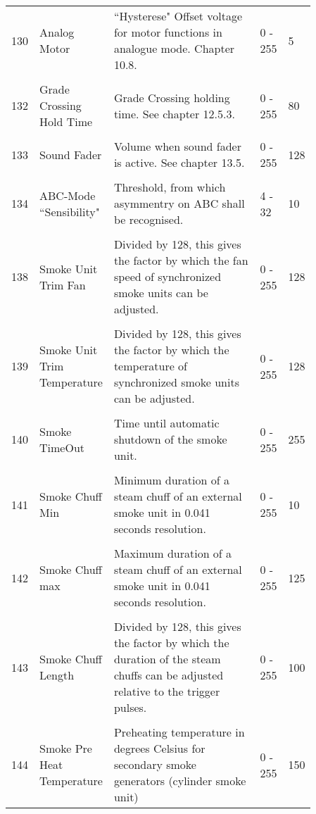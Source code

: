 \begin{tabular}{p{0.075\linewidth} p{0.15\linewidth} p{0.525\linewidth} p{0.06\linewidth} p{0.05\linewidth}}
\\
130 & Analog Motor & ``Hysterese" Offset voltage for motor functions in analogue mode. Chapter 10.8. & 0 - 255 & 5\\
\\
132 & Grade Crossing Hold Time & Grade Crossing holding time. See chapter 12.5.3. & 0 - 255 & 80\\
\\
133 & Sound Fader & Volume when sound fader is active. See chapter 13.5. & 0 - 255 & 128\\
\\
134 & ABC-Mode ``Sensibility" & Threshold, from which asymmentry on ABC shall be recognised. & 4 - 32 & 10\\
\\
138 & Smoke Unit Trim Fan & Divided by 128, this gives the factor by which the fan speed of synchronized smoke units can be adjusted. & 0 - 255 & 128\\
\\
139 & Smoke Unit Trim Temperature & Divided by 128, this gives the factor by which the temperature of synchronized smoke units can be adjusted. & 0 - 255 & 128\\
\\
140 & Smoke TimeOut & Time until automatic shutdown of the smoke unit. & 0 - 255 & 255\\
\\
141 & Smoke Chuff Min & Minimum duration of a steam chuff of an external smoke unit in 0.041 seconds resolution. & 0 - 255 & 10\\
\\
142 & Smoke Chuff max & Maximum duration of a steam chuff of an external smoke unit in 0.041 seconds resolution. & 0 - 255 & 125\\
\\
143 & Smoke Chuff Length & Divided by 128, this gives the factor by which the duration of the steam chuffs can be adjusted relative to the trigger pulses. & 0 - 255 & 100\\
\\
144 & Smoke Pre Heat Temperature & Preheating temperature in degrees Celsius for secondary smoke generators (cylinder smoke unit) & 0 - 255 & 150\\
\end{tabular}
\newpage
